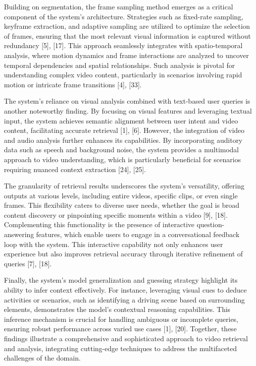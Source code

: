 \documentclass[conference]{IEEEtran}
\begin{document}
Building on segmentation, the frame sampling method emerges as a critical component of the system's architecture. Strategies such as fixed-rate sampling, keyframe extraction, and adaptive sampling are utilized to optimize the selection of frames, ensuring that the most relevant visual information is captured without redundancy [5], [17]. This approach seamlessly integrates with spatio-temporal analysis, where motion dynamics and frame interactions are analyzed to uncover temporal dependencies and spatial relationships. Such analysis is pivotal for understanding complex video content, particularly in scenarios involving rapid motion or intricate frame transitions [4], [33].

The system's reliance on visual analysis combined with text-based user queries is another noteworthy finding. By focusing on visual features and leveraging textual input, the system achieves semantic alignment between user intent and video content, facilitating accurate retrieval [1], [6]. However, the integration of video and audio analysis further enhances its capabilities. By incorporating auditory data such as speech and background noise, the system provides a multimodal approach to video understanding, which is particularly beneficial for scenarios requiring nuanced context extraction [24], [25].

The granularity of retrieval results underscores the system's versatility, offering outputs at various levels, including entire videos, specific clips, or even single frames. This flexibility caters to diverse user needs, whether the goal is broad content discovery or pinpointing specific moments within a video [9], [18]. Complementing this functionality is the presence of interactive question-answering features, which enable users to engage in a conversational feedback loop with the system. This interactive capability not only enhances user experience but also improves retrieval accuracy through iterative refinement of queries [7], [18].

Finally, the system's model generalization and guessing strategy highlight its ability to infer context effectively. For instance, leveraging visual cues to deduce activities or scenarios, such as identifying a driving scene based on surrounding elements, demonstrates the model's contextual reasoning capabilities. This inference mechanism is crucial for handling ambiguous or incomplete queries, ensuring robust performance across varied use cases [1], [20]. Together, these findings illustrate a comprehensive and sophisticated approach to video retrieval and analysis, integrating cutting-edge techniques to address the multifaceted challenges of the domain.
\end{document}
